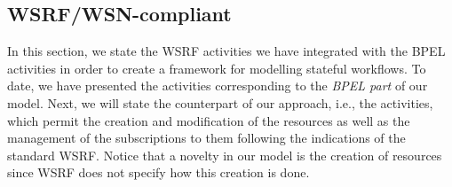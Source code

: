 \subsection*{WSRF/WSN-compliant}
In this section, we state the WSRF activities we have integrated with the BPEL activities in order to create a framework for modelling stateful workflows. 
To date, we have presented the activities corresponding to the \emph{BPEL part} of our model. Next, we will state the counterpart of our approach, i.e., the activities, which permit the creation and modification of the resources as well as the management of the subscriptions to them following the indications of the standard WSRF. Notice that a novelty in our model is the creation of resources since WSRF does not specify how this creation is done.

